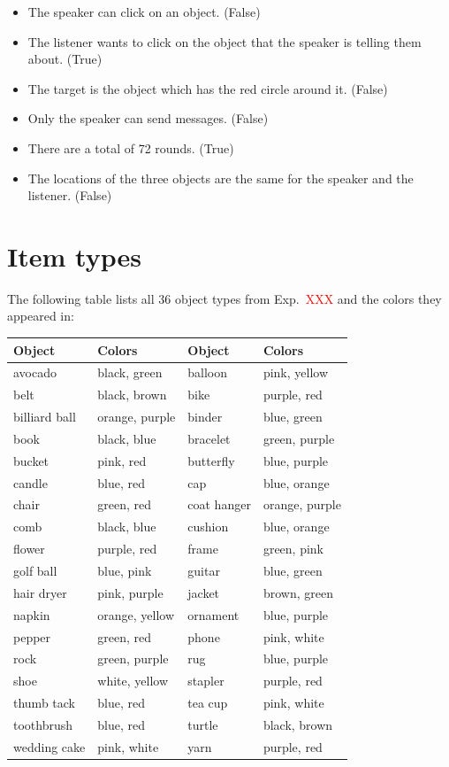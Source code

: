 \documentclass[11pt]{article}
\newcommand{\red}[1]{\textcolor{Red}{#1}}
\begin{document}
\begin{itemize}
	\item The speaker can click on an object. (False)
	\item The listener wants to click on the object that the speaker is
  telling them about. (True)
  \item  The target is the object which has the red circle around it. (False)
  \item Only the speaker can send messages. (False)
  \item There are a total of 72 rounds. (True)
  \item The locations of the three objects are the same for the speaker and the listener. (False)
\end{itemize}


\section{Item types}
\label{app:itemtypes}

The following table lists all 36 object types from Exp.~\red{XXX} and the colors they appeared in:

\begin{tabular}{l l l l}
\toprule
Object & Colors & Object & Colors \\
\midrule
avocado & black, green & balloon & pink, yellow \\
belt & black, brown & bike & purple, red\\
billiard ball & orange, purple & binder & blue, green \\
book & black, blue & bracelet & green, purple \\
bucket & pink, red & butterfly & blue, purple\\
candle & blue, red & cap & blue, orange \\
chair & green, red & coat hanger & orange, purple \\
comb & black, blue & cushion & blue, orange\\
flower & purple, red & frame & green, pink \\
golf ball & blue, pink & guitar & blue, green\\
hair dryer & pink, purple & jacket & brown, green\\
napkin & orange, yellow & ornament & blue, purple\\
pepper & green, red & phone & pink, white\\
rock & green, purple & rug & blue, purple \\
shoe & white, yellow & stapler & purple, red\\
thumb tack & blue, red & tea cup & pink, white \\
toothbrush & blue, red & turtle & black, brown \\
wedding cake & pink, white & yarn & purple, red\\
\bottomrule
\end{tabular}
\end{document}
